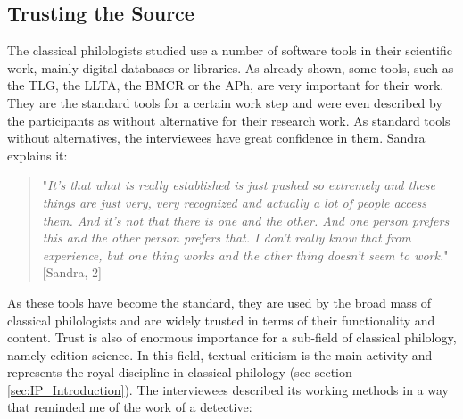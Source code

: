 \documentclass[12pt, a4paper, titlepage, oneside, abstract=true, toc=listof, toc=bibliography, BCOR=1cm]{scrreprt}
\begin{document}
{%




\subsection{Trusting the Source}
\label{sec:trust}
The classical philologists studied use a number of software tools in their scientific work, mainly digital databases or libraries. As already shown, some tools, such as the TLG, the LLTA, the BMCR or the APh, are very important for their work. They are the standard tools for a certain work step and were even described by the participants as without alternative for their research work. As standard tools without alternatives, the interviewees have great confidence in them. Sandra explains it:

\begin{quotation}
"\textit{It's that what is really established is just pushed so extremely and these things are just very, very recognized and actually a lot of people access them. And it's not that there is one and the other. And one person prefers this and the other person prefers that. I don't really know that from experience, but one thing works and the other thing doesn't seem to work.}" [Sandra, 2]
\end{quotation}

As these tools have become the standard, they are used by the broad mass of classical philologists and are widely trusted in terms of their functionality and content. 
Trust is also of enormous importance for a sub-field of classical philology, namely edition science. In this field, textual criticism is the main activity and represents the royal discipline in classical philology (see section \ref{sec:IP_Introduction}). The interviewees described its working methods in a way that reminded me of the work of a detective:

}
\end{document}
